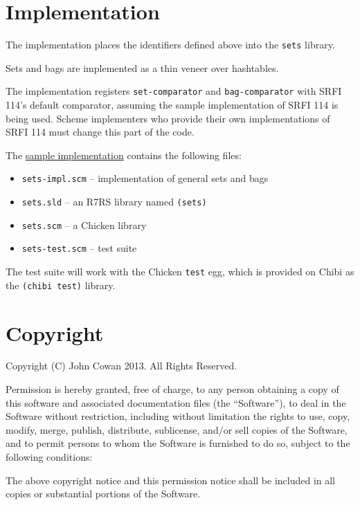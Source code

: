\section{Implementation}\label{implementation}

The implementation places the identifiers defined above into the
\texttt{sets} library.

Sets and bags are implemented as a thin veneer over hashtables.

The implementation registers \texttt{set-comparator} and
\texttt{bag-comparator} with SRFI 114's default comparator, assuming the
sample implementation of SRFI 114 is being used. Scheme implementers who
provide their own implementations of SRFI 114 must change this part of
the code.

The \href{http://srfi.schemers.org/srfi-113/sets.tar.gz}{sample
implementation} contains the following files:

\begin{itemize}
\tightlist
\item
  \texttt{sets-impl.scm} -- implementation of general sets and bags
\item
  \texttt{sets.sld} -- an R7RS library named \texttt{(sets)}
\item
  \texttt{sets.scm} -- a Chicken library
\item
  \texttt{sets-test.scm} -- test suite
\end{itemize}

The test suite will work with the Chicken \texttt{test} egg, which is
provided on Chibi as the \texttt{(chibi\ test)} library.

\section{Copyright}\label{copyright}

Copyright (C) John Cowan 2013. All Rights Reserved.

Permission is hereby granted, free of charge, to any person obtaining a
copy of this software and associated documentation files (the
``Software''), to deal in the Software without restriction, including
without limitation the rights to use, copy, modify, merge, publish,
distribute, sublicense, and/or sell copies of the Software, and to
permit persons to whom the Software is furnished to do so, subject to
the following conditions:

The above copyright notice and this permission notice shall be included
in all copies or substantial portions of the Software.

